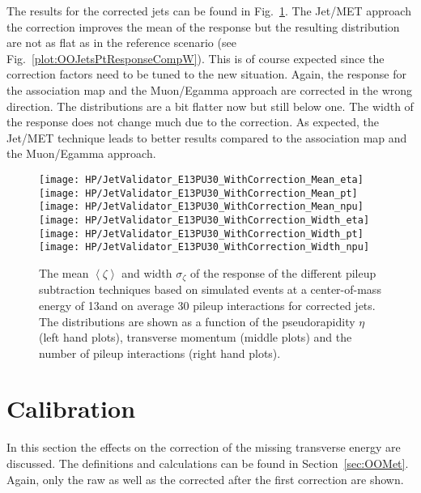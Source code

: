 The results for the corrected jets can be found in Fig.~\ref{plot:HPUJetE13PU30W}. The Jet/MET approach the correction improves the mean of the \pt{} response but the resulting distribution are not as flat as in the reference scenario (see Fig.~\ref{plot:OOJetsPtResponseCompW}). This is of course expected since the correction factors need to be tuned to the new situation. Again, the \pt{} response for the association map and the Muon/Egamma approach are corrected in the wrong direction. The distributions are a bit flatter now but still below one. The width of the \pt{} response does not change much due to the correction. As expected, the Jet/MET technique leads to better results compared to the association map and the Muon/Egamma approach.

\begin{figure}[Ht]
  \centering
  \texttt{[image: HP/JetValidator\_E13PU30\_WithCorrection\_Mean\_eta]}
  \texttt{[image: HP/JetValidator\_E13PU30\_WithCorrection\_Mean\_pt]}
  \texttt{[image: HP/JetValidator\_E13PU30\_WithCorrection\_Mean\_npu]}
  \\
  \texttt{[image: HP/JetValidator\_E13PU30\_WithCorrection\_Width\_eta]}
  \texttt{[image: HP/JetValidator\_E13PU30\_WithCorrection\_Width\_pt]}
  \texttt{[image: HP/JetValidator\_E13PU30\_WithCorrection\_Width\_npu]}
  \caption[Mean and width of the \pt{} response of different pileup subtraction techniques based on simulated \ttbar events with 13\TeV and $\left<PU\right>=30$ for corrected jets]{The mean $\left<\zeta\right>$  and width $\sigma_{\zeta}$ of the \pt{} response of the different pileup subtraction techniques based on simulated \ttbar events at a center-of-mass energy of 13\TeV and on average 30 pileup interactions for corrected jets. The distributions are shown as a function of the pseudorapidity $\eta$ (left hand plots), transverse momentum (middle plots) and the number of pileup interactions (right hand plots). \label{plot:HPUJetE13PU30W}}
\end{figure}

\section{\texorpdfstring{\MET{}}{MET} Calibration \label{sec:HPUMET}}

In this section the effects on the correction of the missing transverse energy are discussed. The definitions and calculations can be found in Section~\ref{sec:OOMet}. Again, only the raw \MET{} as well as the corrected \MET{} after the first correction are shown.

